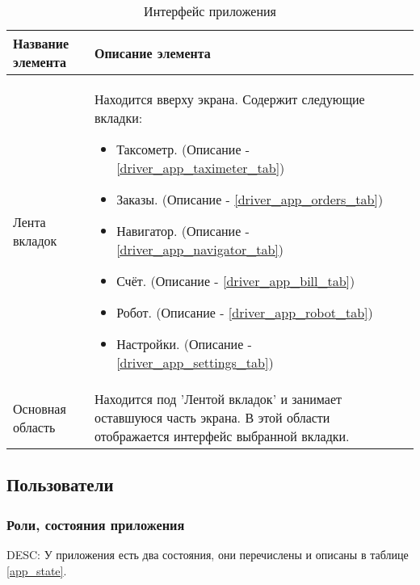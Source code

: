     \begin{table}
    \begin{center}
    \caption {Интерфейс приложения}
    \label{app_interface}
    \setlength{\extrarowheight}{2mm}
      \begin{tabular}{|p{5cm}|p{10cm}|}
        \hline     \textbf{Название элемента}&\textbf{Описание элемента} \\ [2mm]

        \hline   Лента вкладок & Находится вверху экрана. Содержит следующие вкладки: \begin{itemize} \item Таксометр. (Описание - \ref{driver_app_taximeter_tab}) \item Заказы. (Описание - \ref{driver_app_orders_tab}) \item Навигатор. (Описание - \ref{driver_app_navigator_tab}) \item Счёт. (Описание - \ref{driver_app_bill_tab}) \item Робот. (Описание - \ref{driver_app_robot_tab}) \item Настройки. (Описание - \ref{driver_app_settings_tab}) \end{itemize}\\ [2mm]

        \hline   Основная область & Находится под 'Лентой вкладок' и занимает оставшуюся часть экрана. В этой области отображается интерфейс выбранной вкладки.\\ [2mm]

        \hline
      \end{tabular}
    \end{center}
    \end{table}

  \subsection{Пользователи} \label{driver_app_users_tab}

      \subsubsection{Роли, состояния приложения}

      		DESC: У приложения есть два состояния, они перечислены и описаны в таблице \ref{app_state}. 

